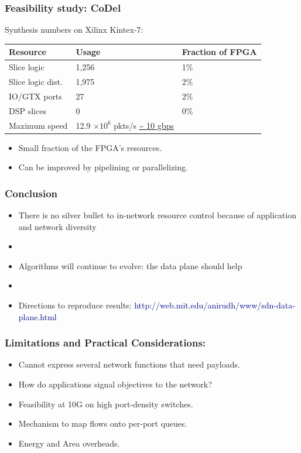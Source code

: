 \begin{frame}[plain]
\frametitle{Feasibility study: CoDel}
\begin{center}
Synthesis numbers on Xilinx Kintex-7: \\
\begin{tabular}{lll}
\bf Resource & \bf Usage & \bf Fraction of FPGA \\
\hline Slice logic & 1,256 & 1\% \\
Slice logic dist. & 1,975 & 2\% \\
IO/GTX ports & 27 & 2\% \\
DSP slices & 0 & 0\% \\
Maximum speed & 12.9 $\times 10^6$ pkts/s \url{~ 10 gbps} \\
\end{tabular}
\end{center}
\begin{itemize}
\item Small fraction of the FPGA's resources.
\item Can be improved by pipelining or parallelizing.
\end{itemize}
\end{frame}

\begin{frame}[plain]

\frametitle{Conclusion}
\begin{itemize}

\item There is no silver bullet to in-network resource control because
  of application and network diversity

\item[]
\item Algorithms will continue to evolve: the data plane should help

\item[]
\item Directions to reproduce results: \textcolor{DarkBlue}{http://web.mit.edu/anirudh/www/sdn-data-plane.html} 

\end{itemize}
\end{frame}


\begin{frame}[plain]
\frametitle{Limitations and Practical Considerations:}
\begin{itemize}
\item Cannot express several network functions that need payloads.
\item How do applications signal objectives to the network?
\item Feasibility at 10G on high port-density  switches.
\item Mechanism to map flows onto per-port queues.
\item Energy and Area overheads.
\end{itemize}
\end{frame}


